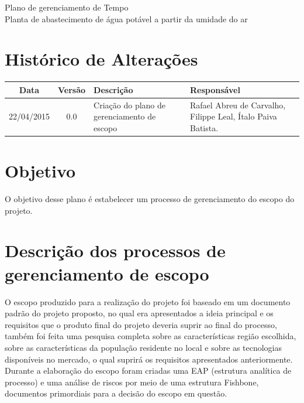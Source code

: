 % 
% 
% 
\begin{center}
 {\large Plano de gerenciamento de Tempo}\\[0.2cm]
 {Planta de abastecimento de água potável a partir da umidade do ar}\\
 \end{center}
 
 \section*{Histórico de Alterações}
\begin{table}[h]
\centering
\begin{tabular}{|c|c|p{6cm}|p{5cm}|}

Data & Versão & Descrição & Responsável\\
\hline                               
22/04/2015 & 0.0 & Criação do plano de gerenciamento de escopo & Rafael Abreu de Carvalho, Filippe Leal, Ítalo Paiva Batista. \\
\hline
\end{tabular}
\end{table}

\section*{Objetivo}
O objetivo desse plano é estabelecer um processo de gerenciamento do escopo do projeto.

\section*{Descrição dos processos de gerenciamento de escopo}
O escopo produzido para a realização do projeto foi baseado em um documento padrão do projeto proposto, no qual era apresentados a ideia principal e os requisitos que o produto final do projeto deveria suprir ao final do processo, também foi feita uma pesquisa completa sobre as características região escolhida, sobre as características da população residente no local e sobre as tecnologias disponíveis no mercado, o qual suprirá os requisitos apresentados anteriormente. Durante a elaboração do escopo foram criadas uma EAP (estrutura analítica de processo) e uma análise de riscos por meio de uma estrutura Fishbone, documentos primordiais para a decisão do escopo em questão.

